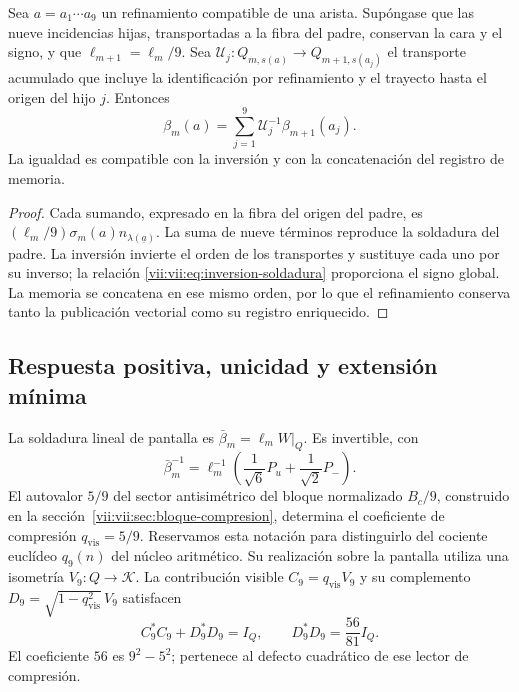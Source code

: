 \begin{proposition}
\label{vii:vii:prop:refinamiento-soldadura}
Sea \(a=a_1\cdots a_9\) un refinamiento compatible de una arista.
Supóngase que las nueve incidencias hijas, transportadas a la fibra del
padre, conservan la cara y el signo, y que
\(\ell_{m+1}=\ell_m/9\). Sea
\(\mathcal U_j:Q_{m,s(a)}\longrightarrow Q_{m+1,s(a_j)}\)
el transporte acumulado que incluye la identificación por refinamiento
y el trayecto hasta el origen del hijo \(j\). Entonces
\[
 \beta_m(a)=
 \sum_{j=1}^{9}\mathcal U_j^{-1}\beta_{m+1}(a_j).
\]
La igualdad es compatible con la inversión y con la concatenación
del registro de memoria.
\end{proposition}

\begin{proof}
Cada sumando, expresado en la fibra del origen del padre, es
\((\ell_m/9)\sigma_m(a)n_{\lambda(\underline a)}\).
La suma de nueve términos reproduce la soldadura del padre.
La inversión invierte el orden de los transportes y sustituye cada uno
por su inverso; la relación \eqref{vii:vii:eq:inversion-soldadura} proporciona
el signo global. La memoria se concatena en ese mismo orden, por lo
que el refinamiento conserva tanto la publicación vectorial como su
registro enriquecido.
\end{proof}

\subsection{Respuesta positiva, unicidad y extensión mínima}
\label{vii:vii:sec:respuesta-positiva}

La soldadura lineal de pantalla es
\(\bar\beta_m=\ell_mW|_Q\). Es invertible, con
\[
 \bar\beta_m^{-1}
 =\ell_m^{-1}\left(\frac1{\sqrt6}P_u+\frac1{\sqrt2}P_-\right).
\]
El autovalor \(5/9\) del sector antisimétrico del bloque normalizado
\(B_c/9\), construido en la sección~\ref{vii:vii:sec:bloque-compresion},
determina el coeficiente de
compresión \(q_{\mathrm{vis}}=5/9\). Reservamos esta notación para
distinguirlo del cociente euclídeo \(q_9(n)\) del núcleo aritmético.
Su realización sobre la pantalla utiliza una isometría
\(V_9:Q\longrightarrow\mathcal K\). La contribución visible
\(C_9=q_{\mathrm{vis}}V_9\) y su complemento
\(D_9=\sqrt{1-q_{\mathrm{vis}}^2}\,V_9\) satisfacen
\[
 C_9^*C_9+D_9^*D_9=I_Q,\qquad D_9^*D_9=\frac{56}{81}I_Q.
\]
El coeficiente \(56\) es \(9^2-5^2\); pertenece al defecto cuadrático
de ese lector de compresión.

